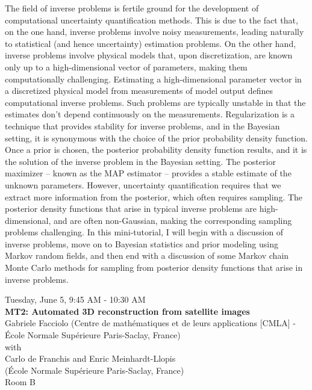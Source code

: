 The field of inverse problems is fertile ground for the development of computational uncertainty quantification methods. This is due to the fact that, on the one hand, inverse problems involve noisy measurements, leading naturally to statistical (and hence uncertainty) estimation problems. On the other hand, inverse problems involve physical models that, upon discretization, are known only up to a high-dimensional vector of parameters, making them computationally challenging. Estimating a high-dimensional parameter vector in a discretized physical model from measurements of model output defines computational inverse problems. Such problems are typically unstable in that the estimates don’t depend continuously on the measurements. Regularization is a technique that provides stability for inverse problems, and in the Bayesian setting, it is synonymous with the choice of the prior probability density function. Once a prior is chosen, the posterior probability density function results, and it is the solution of the inverse problem in the Bayesian setting. The posterior maximizer – known as the MAP estimator – provides a stable estimate of the unknown parameters. However, uncertainty quantification requires that we extract more information from the posterior, which often requires sampling. The posterior density functions that arise in typical inverse problems are high-dimensional, and are often non-Gaussian, making the corresponding sampling problems challenging. In this mini-tutorial, I will begin with a discussion of inverse problems, move on to Bayesian statistics and prior modeling using Markov random fields, and then end with a discussion of some Markov chain Monte Carlo methods for sampling from posterior density functions that arise in inverse problems.   

\newpage\vspace{2cm}
\begin{center}{\Large{
      Tuesday, June 5, 9:45 AM - 10:30 AM \\
      \textbf{MT2: Automated 3D reconstruction from satellite images}\\
      Gabriele Facciolo (Centre de math\'ematiques et de leurs applications [CMLA] - \'Ecole Normale Sup\'erieure Paris-Saclay, France)  \\ with \\ Carlo de Franchis and Enric Meinhardt-Llopis \\(\'Ecole Normale Sup\'erieure Paris-Saclay, France)\\ Room B
}}
\end{center}
\vspace{1cm}

